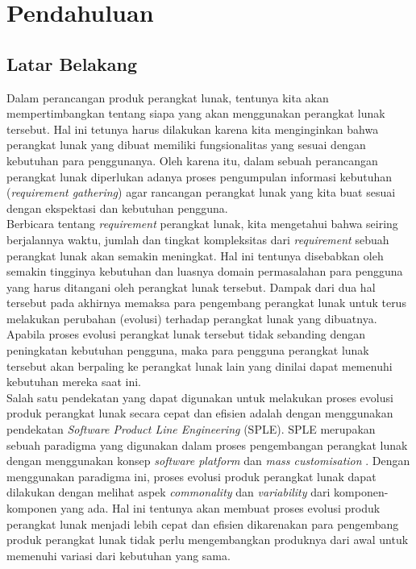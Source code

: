 \chapter{Pendahuluan}

\section{Latar Belakang}
Dalam perancangan produk perangkat lunak, tentunya kita akan mempertimbangkan tentang siapa yang akan menggunakan perangkat lunak tersebut. Hal ini tetunya harus dilakukan karena kita menginginkan bahwa perangkat lunak yang dibuat memiliki fungsionalitas yang sesuai dengan kebutuhan para penggunanya. Oleh karena itu, dalam sebuah perancangan perangkat lunak diperlukan adanya proses pengumpulan informasi kebutuhan (\textit{requirement gathering}) agar rancangan perangkat lunak yang kita buat sesuai dengan ekspektasi dan kebutuhan pengguna. \\

\noindent
Berbicara tentang \textit{requirement} perangkat lunak, kita mengetahui bahwa seiring berjalannya waktu, jumlah dan tingkat kompleksitas dari \textit{requirement} sebuah perangkat lunak akan semakin meningkat. Hal ini tentunya disebabkan oleh semakin tingginya kebutuhan dan luasnya domain permasalahan para pengguna yang harus ditangani oleh perangkat lunak tersebut. Dampak dari dua hal tersebut pada akhirnya memaksa para pengembang perangkat lunak untuk terus melakukan perubahan (evolusi) terhadap perangkat lunak yang dibuatnya. Apabila proses evolusi perangkat lunak tersebut tidak sebanding dengan peningkatan kebutuhan pengguna, maka para pengguna perangkat lunak tersebut akan berpaling ke perangkat lunak lain yang dinilai dapat memenuhi kebutuhan mereka saat ini. \\

\noindent
Salah satu pendekatan yang dapat digunakan untuk melakukan proses evolusi produk perangkat lunak secara cepat dan efisien adalah dengan menggunakan pendekatan \textit{Software Product Line Engineering} (SPLE). SPLE merupakan sebuah paradigma yang digunakan dalam proses pengembangan perangkat lunak dengan menggunakan konsep \textit{software platform} dan \textit{mass customisation} \citep[p.~14]{pohl2005software}. Dengan menggunakan paradigma ini, proses evolusi produk perangkat lunak dapat dilakukan dengan melihat aspek \textit{commonality} dan \textit{variability} dari komponen-komponen yang ada. Hal ini tentunya akan membuat proses evolusi produk perangkat lunak menjadi lebih cepat dan efisien dikarenakan para pengembang produk perangkat lunak tidak perlu mengembangkan produknya dari awal untuk memenuhi variasi dari kebutuhan yang sama. \\

